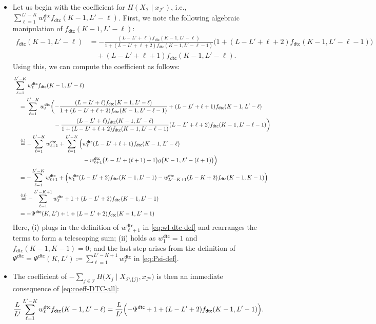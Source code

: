 \documentclass[english]{article}
\newcommand{\defn}{\coloneqq}
\newcommand{\cI}{\mathcal{I}}
\newcommand{\numpf}[2]{\overset{(\mathrm{#1})}{#2}}
\newcommand{\dtc}{\mathsf{dtc}}
\begin{document}
\begin{itemize}
    \item 

Let us begin with the coefficient for $H(X_{\cI} \mid x_{\cI^\mathsf{c}})$, i.e., $\sum_{\ell = 1}^{L'-K} w^\dtc_{\ell} f_\dtc(K-1, L'-\ell)$. First, we note the following algebraic manipulation of $f_\dtc(K-1, L'-\ell)$:
\begin{align*}
f_\dtc(K-1, L'-\ell) & =
- \frac{(L-L'+\ell)f_\dtc(K-1, L'-\ell)}{1 + (L-L'+\ell+2)f_\dtc(K-1, L'-\ell-1)} \Big(1 + (L-L'+\ell+2)f_\dtc(K-1, L'-\ell-1) \Big) \\ 
& \quad + (L-L'+\ell+1)f_\dtc(K-1, L'-\ell).
\end{align*}
Using this, we can compute the coefficient as follows:
\begin{align}
&\sum_{\ell = 1}^{L'-K} w^\dtc_{\ell} f_\dtc(K-1, L'-\ell) \notag\\
&\quad = \sum_{\ell = 1}^{L'-K} w^\dtc_{\ell}\biggl( - \frac{(L-L'+\ell)f_\dtc(K-1, L'-\ell)}{1 + (L-L'+\ell+2)f_\dtc(K-1, L'-\ell-1)} + (L-L'+\ell+1)f_\dtc(K-1, L'-\ell) \notag\\
&\quad \qquad \qquad\qquad - \frac{(L-L'+\ell)f_\dtc(K-1, L'-\ell)}{1 + (L-L'+\ell+2)f_\dtc(K-1, L'-\ell-1)}(L-L'+\ell+2)f_\dtc(K-1, L'-\ell-1)\biggr) \notag\\
&\quad \numpf{i}{=} -\sum_{\ell = 1}^{L'-K} w^\dtc_{\ell + 1} + \sum_{\ell = 1}^{L'-K} \Big( w^\dtc_{\ell} (L-L'+\ell+1)f_\dtc(K-1, L'-\ell) \notag\\
& \hspace{12em}- w^\dtc_{\ell + 1} \big(L-L'+(\ell + 1)+1\big)g\big(K-1, L'-(\ell + 1)\big) \Big) \notag\\
&\quad = -\sum_{\ell = 1}^{L'-K} w^\dtc_{\ell + 1} + \Big(w^\dtc_1 (L-L'+2)f_\dtc(K-1, L'-1) - w^\dtc_{L'-K+1} (L-K+2)f_\dtc(K-1, K-1) \Big) \notag\\
& \quad \numpf{ii}{=} -\sum_{\ell = 1}^{L'-K+1} w^\dtc_{\ell} + 1 + (L-L'+2)f_\dtc(K-1,L'-1) \\
& \quad = -\Psi^\dtc(K,L') + 1 + (L-L'+2)f_\dtc(K-1,L'-1) \label{eq:coeff-DTC-all}
\end{align}
Here, (i) plugs in the definition of $w^\dtc_{\ell + 1}$ in \eqref{eq:wl-dtc-def} and rearranges the terms to form a telescoping sum; (ii) holds as $w^\dtc_1 = 1$ and $f_\dtc(K-1,K-1)=0$; and the last step arises from the definition of $\Psi^\dtc = \Psi^\dtc(K,L') \defn \sum_{\ell = 1}^{L'-K+1} w^\dtc_{\ell}$ in \eqref{eq:Psi-def}.

\item The coefficient of $-\sum_{j \in \cI} H\big(X_j \mid X_{\cI \setminus \{j\}}, x_{\cI^\mathsf{c}}\big) $ is then an immediate consequence of \eqref{eq:coeff-DTC-all}:
\begin{align}
\frac{L}{L'} \sum_{\ell = 1}^{L'-K} w^\dtc_{\ell}  f_\dtc(K-1, L'-\ell) &= \frac{L}{L'} \Bigl(-\Psi^\dtc + 1 + (L-L'+2)f_\dtc(K-1,L'-1)\Bigr).\label{eq:coeff-DTC-dual}
\end{align}


\end{itemize}
\end{document}
